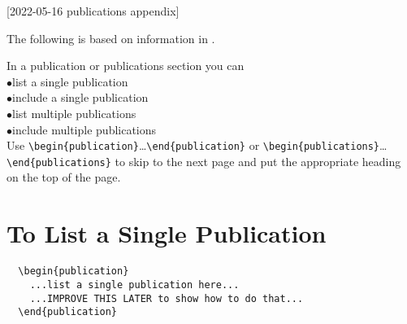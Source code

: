 [2022-05-16 publications appendix]

\index{\verb+\begin{publications}+}
    
The following is based on information in
\cite{template1,template2,template3}.

\renewcommand{\I}{\hspace*{2\ZZparindent}$\bullet$\hspace*{1.5em}}

In a publication or publications section you can\\
  \I list a single publication\\
  \I include a single publication\\
  \I list multiple publications\\
  \I include multiple publications\\
Use\newline
\hspace*{0.5in}\verb+\begin{publication}+\ldots\verb+\end{publication}+\newline
or\newline
\hspace*{0.5in}\verb+\begin{publications}+\ldots\verb+\end{publications}+\newline
to skip to the next page and put the appropriate heading on the
top of the page.

\vspace*{1.5\baselineskip}

\section*{To List a Single Publication}

\begin{verbatim}
  \begin{publication}
    ...list a single publication here...
    ...IMPROVE THIS LATER to show how to do that...
  \end{publication}
\end{verbatim}


